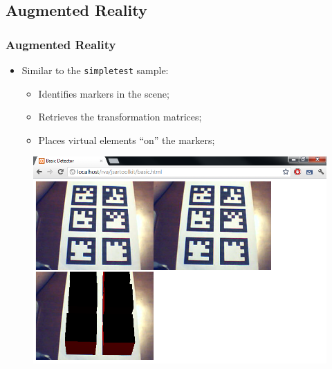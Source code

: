 \documentclass{beamer}
\begin{document}
\subsection{Augmented Reality}
\begin{frame}
	\frametitle{Augmented Reality}
	\begin{itemize}
		\item{Similar to the \texttt{simpletest} sample:
		\begin{itemize}
			\item{Identifies markers in the scene;}
			\item{Retrieves the transformation matrices;}
			\item{Places virtual elements ``on'' the markers;}
		\end{itemize}
		}
	\end{itemize}
	
	\begin{figure}
		\begin{center}
			\includegraphics[width=0.6\linewidth]{slides/images/basic.png}
		\end{center}
	\end{figure}
\end{frame}
\end{document}
